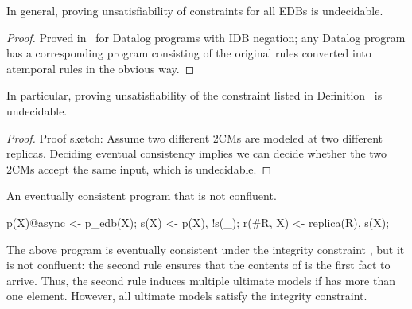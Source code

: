 \begin{lemma}
In general, proving unsatisfiability of constraints for all EDBs is undecidable.
\end{lemma}
\begin{proof}
Proved in~\cite{qs-datalog} for Datalog programs with IDB negation; any Datalog program has a corresponding \lang program consisting of the original rules converted into atemporal \lang rules in the obvious way.
\end{proof}

\begin{lemma}
In particular, proving unsatisfiability of the constraint listed in Definition~\label{def:ec} is undecidable.
\end{lemma}
\begin{proof}
Proof sketch: Assume two different 2CMs are modeled at two different replicas.  Deciding eventual consistency implies we can decide whether the two 2CMs accept the same input, which is undecidable.
\end{proof}


\begin{example}
An eventually consistent program that is not confluent.

\begin{Dedalus}
p(X)@async <- p_edb(X);
s(X) <- p(X), !s(_);
r(#R, X) <- replica(R), s(X);
\end{Dedalus}
\end{example}

The above program is eventually consistent under the integrity constraint , but it is not confluent: the second rule ensures that the contents of  is the first  fact to arrive.  Thus, the second rule induces multiple ultimate models if  has more than one element.  However, all ultimate models satisfy the integrity constraint. 

